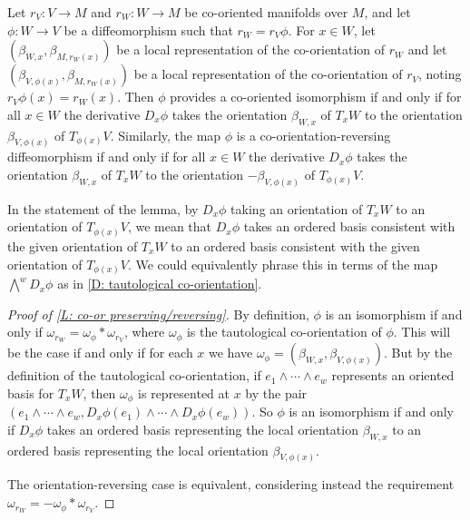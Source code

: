 \begin{lemma}\label{L: co-or preserving/reversing}
	Let $r_V \colon V \to M$ and $r_W \colon W \to M$ be co-oriented manifolds over $M$, and let $\phi \colon W \to V$ be a diffeomorphism such that $r_W = r_V \phi$.
	For $x \in W$, let $(\beta_{W,x},\beta_{M,r_W(x)})$ be a local representation of the co-orientation of $r_W$ and let $(\beta_{V, \phi(x)},\beta_{M,r_W(x)})$ be a local representation of the co-orientation of $r_V$, noting $r_V\phi(x)=r_W(x)$.
	Then $\phi$ provides a co-oriented isomorphism if and only if for all $x\in W$ the derivative $D_x\phi$ takes the orientation $\beta_{W,x}$ of $T_xW$ to the orientation $\beta_{V, \phi(x)}$ of $T_{\phi(x)}V$.
	Similarly, the map $\phi$ is a co-orientation-reversing diffeomorphism if and only if for all $x\in W$ the derivative $D_x\phi$ takes the orientation $\beta_{W,x}$ of $T_xW$ to the orientation $-\beta_{V, \phi(x)}$ of $T_{\phi(x)}V$.
\end{lemma}

In the statement of the lemma, by $D_x\phi$ taking an orientation of $T_xW$ to an orientation of $T_{\phi(x)}V$, we mean that $D_x\phi$ takes an ordered basis consistent with the given orientation of $T_xW$ to an ordered basis consistent with the given orientation of $T_{\phi(x)}V$.
We could equivalently phrase this in terms of the map $\textstyle{\bigwedge^w}D_x\phi$ as in \cref{D: tautological co-orientation}.

\begin{proof}[Proof of \cref{L: co-or preserving/reversing}]
	By definition, $\phi$ is an isomorphism if and only if $\omega_{r_W} = \omega_{\phi} * \omega_{r_V}$, where $\omega_\phi$ is the tautological co-orientation of $\phi$.
	This will be the case if and only if for each $x$ we have $\omega_\phi = (\beta_{W,x}, \beta_{V, \phi(x)})$.
	But by the definition of the tautological co-orientation, if $e_1 \wedge \cdots \wedge e_w$ represents an oriented basis for $T_xW$, then $\omega_\phi$ is represented at $x$ by the pair $(e_1 \wedge \cdots \wedge e_w, D_x\phi(e_1) \wedge \cdots \wedge D_x\phi(e_w))$.
	So $\phi$ is an isomorphism if and only if $D_x\phi$ takes an ordered basis representing the local orientation $\beta_{W,x}$ to an ordered basis representing the local orientation $\beta_{V, \phi(x)}$.

	The orientation-reversing case is equivalent, considering instead the requirement $\omega_{r_W} = - \omega_{\phi} * \omega_{r_V}$.
\end{proof}

